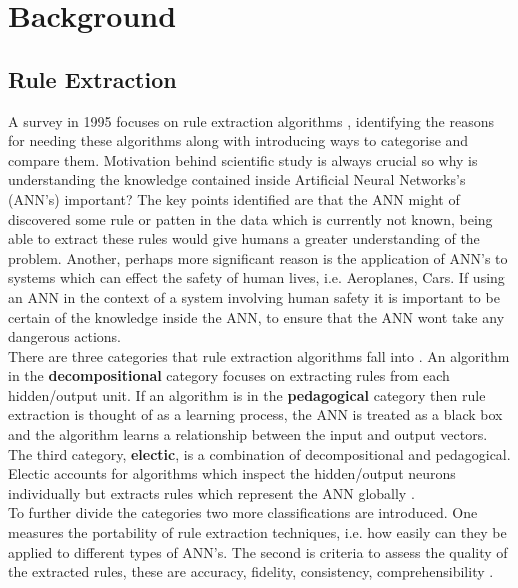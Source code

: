 \chapter{Background}\label{C:backgroundsurvey}
\section{Rule Extraction}

A survey in 1995 focuses on rule extraction algorithms \cite{andrews1995survey}, identifying the reasons for needing these algorithms along with introducing ways to categorise and compare them. Motivation behind scientific study is always crucial so why is understanding the knowledge contained inside Artificial Neural Networks's (ANN's) important? The key points identified are that the ANN might of discovered some rule or patten in the data which is currently not known, being able to extract these rules would give humans a greater understanding of the problem. Another, perhaps more significant reason is the application of ANN's to systems which can effect the safety of human lives, i.e. Aeroplanes, Cars. If using an ANN in the context of a system involving human safety it is important to be certain of the knowledge inside the ANN, to ensure that the ANN wont take any dangerous actions.\\

There are three categories that rule extraction algorithms fall into \cite{andrews1995survey}. An algorithm in the \textbf{decompositional} category focuses on extracting rules from each hidden/output unit. If an algorithm is in the \textbf{pedagogical} category then rule extraction is thought of as a learning process, the ANN is treated as a black box and the algorithm learns a relationship between the input and output vectors. The third category, \textbf{electic}, is a combination of decompositional and pedagogical. Electic accounts for algorithms which inspect the hidden/output neurons individually but extracts rules which represent the ANN globally \cite{tickle1998truth}.\\

To further divide the categories two more classifications are introduced. One measures the portability of rule extraction techniques, i.e. how easily can they be applied to different types of ANN's. The second is criteria to assess the quality of the extracted rules, these are accuracy, fidelity, consistency, comprehensibility \cite{andrews1995survey}.

